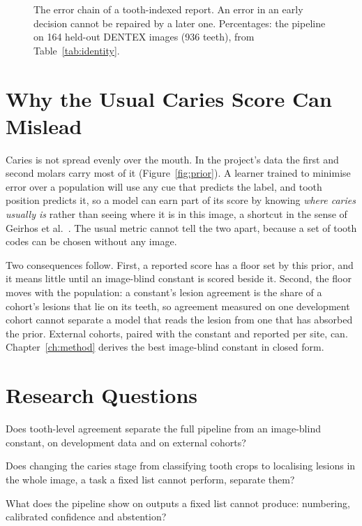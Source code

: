 \begin{figure}[H]
\centering

\caption{The error chain of a tooth-indexed report. An error in an early decision cannot be repaired
by a later one. Percentages: the pipeline on 164 held-out DENTEX images (936 teeth), from
Table~\ref{tab:identity}.}
\label{fig:errorchain}
\end{figure}

\section{Why the Usual Caries Score Can Mislead}

Caries is not spread evenly over the mouth. In the project's data the first and second molars carry
most of it (Figure~\ref{fig:prior}). A learner trained to minimise error over a population will use
any cue that predicts the label, and tooth position predicts it, so a model can earn part of its
score by knowing \emph{where caries usually is} rather than seeing where it is in this image, a
shortcut in the sense of Geirhos et al.~\cite{geirhos2020shortcut}. The usual metric cannot tell the
two apart, because a set of tooth codes can be chosen without any image.

Two consequences follow. First, a reported score has a floor set by this prior, and it means little
until an image-blind constant is scored beside it. Second, the floor moves with the population: a
constant's lesion agreement is the share of a cohort's lesions that lie on its teeth, so agreement
measured on one development cohort cannot separate a model that reads the lesion from one that has
absorbed the prior. External cohorts, paired with the constant and reported per site, can.
Chapter~\ref{ch:method} derives the best image-blind constant in closed form.

\section{Research Questions}

\begin{description}[leftmargin=1.2cm,style=nextline]
\item[RQ1] Does tooth-level agreement separate the full pipeline from an image-blind constant, on
  development data and on external cohorts?
\item[RQ2] Does changing the caries stage from classifying tooth crops to localising lesions in the
  whole image, a task a fixed list cannot perform, separate them?
\item[RQ3] What does the pipeline show on outputs a fixed list cannot produce: numbering, calibrated
  confidence and abstention?
\end{description}

